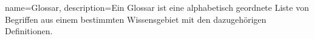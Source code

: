
{
    name=Glossar,
    description={Ein Glossar ist eine alphabetisch geordnete Liste von Begriffen aus einem bestimmten Wissensgebiet mit den dazugehörigen Definitionen.}
}